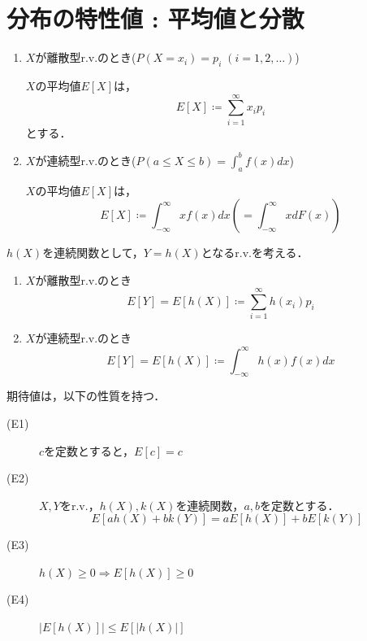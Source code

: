 \documentclass{jsreport}
\begin{document}
\section{分布の特性値 : 平均値と分散}
\begin{screen}
  \begin{defi}[平均値]
    \begin{enumerate}
      \item $X$が離散型r.v.のとき($P(X=x_i) = p_i \; (i = 1, 2, \ldots)$)

      $X$の平均値$E[X]$は，
      \begin{equation}
        E[X] \coloneqq \sum_{i = 1}^{\infty} x_i p_i \nonumber
      \end{equation}
      とする．
      \item $X$が連続型r.v.のとき($P(a \leq X \leq b) = \int_{a}^b f(x) dx$)

      $X$の平均値$E[X]$は，
      \begin{equation}
        E[X] \coloneqq \int_{-\infty}^{\infty} x f(x) dx \left(=\int_{-\infty}^{\infty} x dF(x)\right) \nonumber
      \end{equation}
    \end{enumerate}
  \end{defi}
\end{screen}

\begin{screen}
  \begin{defi}
    $h(X)$を連続関数として，$Y = h(X)$となるr.v.を考える．
    \begin{enumerate}
      \item $X$が離散型r.v.のとき
      \begin{equation}
        E[Y] = E[h(X)] \coloneqq \sum_{i=1}^{\infty} h(x_i)p_i \nonumber
      \end{equation}
      \item $X$が連続型r.v.のとき
      \begin{equation}
        E[Y] = E[h(X)] \coloneqq \int_{-\infty}^{\infty} h(x)f(x) dx \nonumber
      \end{equation}
    \end{enumerate}
  \end{defi}
\end{screen}

期待値は，以下の性質を持つ．
\begin{description}
  \item[(E1)] $c$を定数とすると，$E[c] = c$
  \item[(E2)] $X, Y$をr.v.，$h(X), k(X)$を連続関数，$a,b$を定数とする．
  \begin{equation}
    E[ah(X) + bk(Y)] = aE[h(X)] + bE[k(Y)] \nonumber
  \end{equation}
  \item[(E3)] $h(X) \geq 0 \Longrightarrow E[h(X)] \geq 0$
  \item[(E4)] $|E[h(X)]| \leq E[|h(X)|]$
\end{description}
\end{document}
